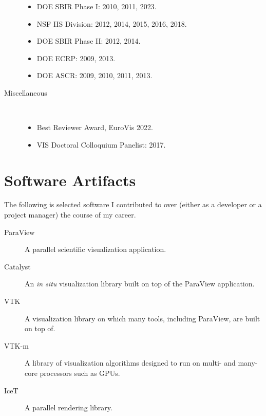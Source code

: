 \documentclass{article}
\begin{document}
\begin{description}
  \begin{itemize}
  \item
    DOE SBIR Phase I: 2010, 2011, 2023.
  \item
    NSF IIS Division: 2012, 2014, 2015, 2016, 2018.
  \item
    DOE SBIR Phase II: 2012, 2014.
  \item
    DOE ECRP: 2009, 2013.
  \item
    DOE ASCR: 2009, 2010, 2011, 2013.
  \end{itemize}
\item[Miscellaneous]~
  \begin{itemize}
  \item
    Best Reviewer Award, EuroVis 2022.
  \item
    VIS Doctoral Colloquium Panelist: 2017.
  \end{itemize}
\end{description}

\section*{Software Artifacts}

The following is selected software I contributed to over (either as a developer or a project manager) the course of my career.

\begin{description}
\item[ParaView] A parallel scientific visualization application.
\item[Catalyst] An \emph{in situ} visualization library built on top of the ParaView application.
\item[VTK] A visualization library on which many tools, including ParaView, are built on top of.
\item[VTK-m] A library of visualization algorithms designed to run on multi- and many-core processors such as GPUs.
\item[IceT] A parallel rendering library.
\end{description}
\end{document}
